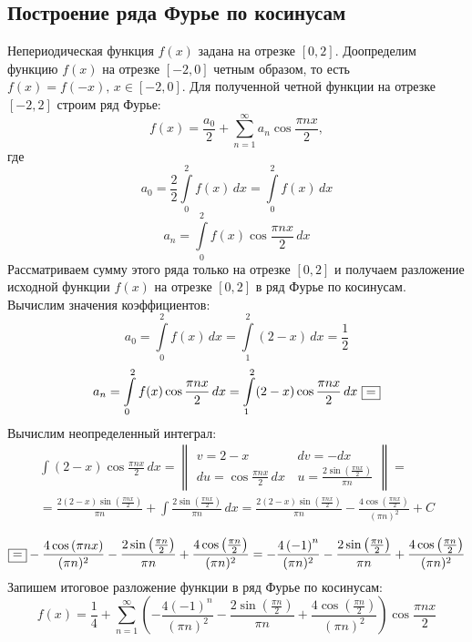 \documentclass[a5paper, 10pt]{article}
\theoremstyle{definition}
\theoremstyle{plain}
\theoremstyle{remark}
\begin{document}
\subsection{Построение ряда Фурье по косинусам}
Непериодическая функция $f(x)$ задана на отрезке $[0, 2]$. Доопределим функцию $f(x)$ на отрезке $[-2, 0]$ четным образом, то есть $f(x) = f(-x), \, x \in [-2, 0]$. Для полученной четной функции на отрезке $[-2, 2]$ строим ряд Фурье:
\begin{equation*} 
f(x) = \frac{a_0}{2} + \sum \limits_{n=1}^{\infty} a_n \cos \frac{\pi n x}{2},
\end{equation*}
где
\begin{equation*} 
a_0 = \frac{2}{2} \int \limits_{0}^{2} f(x) \, dx = \int \limits_{0}^{2} f(x) \, dx
\end{equation*}
\begin{equation*} 
a_n =  \int \limits_{0}^{2} f(x) \cos \frac{\pi n x}{2} \, dx
\end{equation*}
Рассматриваем сумму этого ряда только на отрезке $[0, 2]$ и получаем разложение исходной функции $f(x)$ на отрезке  $[0, 2]$ в ряд Фурье по косинусам.\\
Вычислим значения коэффициентов:
\begin{equation*} 
a_0 = \int \limits_{0}^{2} f(x) \, dx =  \int \limits_{1}^{2} (2-x) \, dx = \frac{1}{2}
\end{equation*}
\begin{equation*} 
a_n =  \int \limits_{0}^{2} f(x) \cos \frac{\pi n x}{2} \, dx = \int \limits_{1}^{2} (2-x) \cos \frac{\pi n x}{2} \, dx \, \, \fbox{=}
\end{equation*}
Вычислим неопределенный интеграл:
\begin{multline*} 
 \int  (2-x) \cos \frac{\pi n x}{2} \, dx = 
\begin{Vmatrix}
v = 2-x \, & dv = -dx\\
du =   \cos \frac{\pi n x}{2} \, dx \, & u = \frac{2 \sin \left( \frac{\pi n x}{2}\right)}{\pi n}
\end{Vmatrix}
=\\= \frac{2 (2-x) \sin \left( \frac{\pi n x}{2}\right)}{\pi n} + \int \frac{2 \sin \left( \frac{\pi n x}{2}\right)}{\pi n}  \, dx =
\frac{2 (2-x) \sin \left( \frac{\pi n x}{2}\right)}{\pi n} - \frac{4 \cos \left( \frac{\pi n x}{2} \right)}{(\pi n)^2} + C
\end{multline*}

\begin{equation*} 
\fbox{=} - \frac{4 \cos \left( \pi n x \right)}{(\pi n)^2} - \frac{2 \sin \left( \frac{\pi n}{2}\right)}{\pi n} + \frac{4 \cos \left( \frac{\pi n }{2} \right)}{(\pi n)^2} = - \frac{4 \left( -1 \right)^n}{(\pi n)^2} - \frac{2 \sin \left( \frac{\pi n}{2}\right)}{\pi n} + \frac{4 \cos \left( \frac{\pi n }{2} \right)}{(\pi n)^2} 
\end{equation*}
Запишем итоговое разложение функции в ряд Фурье по косинусам:
\begin{equation*} 
f(x) = \frac{1}{4} + \sum \limits_{n=1}^{\infty} \left(- \frac{4 \left( -1 \right)^n}{(\pi n)^2} - \frac{2 \sin \left( \frac{\pi n}{2}\right)}{\pi n} + \frac{4 \cos \left( \frac{\pi n }{2} \right)}{(\pi n)^2} \right) \cos \frac{\pi n x}{2}
\end{equation*}
\end{document}
